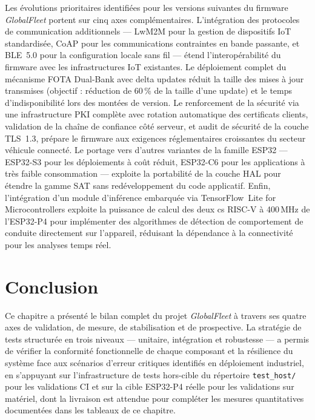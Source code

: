 Les évolutions prioritaires identifiées pour les versions suivantes
du firmware \textit{GlobalFleet} portent sur cinq axes complémentaires.
L'intégration des protocoles de communication additionnels — LwM2M
pour la gestion de dispositifs IoT standardisée, CoAP pour les
communications contraintes en bande passante, et BLE~5.0 pour la
configuration locale sans fil — étend l'interopérabilité du firmware
avec les infrastructures IoT existantes. Le déploiement complet du
mécanisme FOTA Dual-Bank avec delta updates réduit la taille des
mises à jour transmises (objectif : réduction de 60\,\% de la taille
d'une update) et le temps d'indisponibilité lors des montées de version.
Le renforcement de la sécurité via une infrastructure PKI complète avec
rotation automatique des certificats clients, validation de la chaîne
de confiance côté serveur, et audit de sécurité de la couche TLS~1.3,
prépare le firmware aux exigences réglementaires croissantes du
secteur véhicule connecté. Le portage vers d'autres variantes de la
famille ESP32 — ESP32-S3 pour les déploiements à coût réduit, ESP32-C6
pour les applications à très faible consommation — exploite la
portabilité de la couche HAL pour étendre la gamme SAT sans
redéveloppement du code applicatif. Enfin, l'intégration d'un module
d'inférence embarquée via TensorFlow~Lite for Microcontrollers exploite
la puissance de calcul des deux c\oeur{}s RISC-V à 400\,MHz de l'ESP32-P4
pour implémenter des algorithmes de détection de comportement de conduite
directement sur l'appareil, réduisant la dépendance à la connectivité
pour les analyses temps réel.

\section{Conclusion}
\label{sec:conclu_ch5}

Ce chapitre a présenté le bilan complet du projet \textit{GlobalFleet}
à travers ses quatre axes de validation, de mesure, de stabilisation
et de prospective. La stratégie de tests structurée en trois niveaux
— unitaire, intégration et robustesse — a permis de vérifier la
conformité fonctionnelle de chaque composant et la résilience du
système face aux scénarios d'erreur critiques identifiés en déploiement
industriel, en s'appuyant sur l'infrastructure de tests hors-cible
du répertoire \texttt{test\_host/} pour les validations CI et sur
la cible ESP32-P4 réelle pour les validations sur matériel, dont la
livraison est attendue pour compléter les mesures quantitatives
documentées dans les tableaux de ce chapitre.


